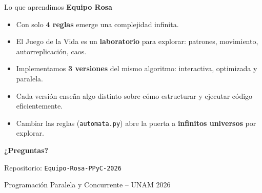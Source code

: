 \documentclass[10pt,aspectratio=169]{beamer}
\begin{document}
\begin{frame}{Lo que aprendimos}
  \textbf{Equipo Rosa}

  \vspace{0.4cm}

  \begin{itemize}
    \item Con solo \textbf{4 reglas} emerge una complejidad infinita.
    \item El Juego de la Vida es un \textbf{laboratorio} para explorar:
          patrones, movimiento, autorreplicación, caos.
    \item Implementamos \textbf{3 versiones} del mismo algoritmo:
          interactiva, optimizada y paralela.
    \item Cada versión enseña algo distinto sobre cómo estructurar
          y ejecutar código eficientemente.
    \item Cambiar las reglas (\texttt{automata.py}) abre la puerta
          a \textbf{infinitos universos} por explorar.
  \end{itemize}

  \vspace{0.5cm}

  \begin{center}
    \Large \textbf{¿Preguntas?}

    \vspace{0.3cm}
    \normalsize
    Repositorio: \texttt{Equipo-Rosa-PPyC-2026}

    Programación Paralela y Concurrente -- UNAM 2026
  \end{center}
\end{frame}
\end{document}
